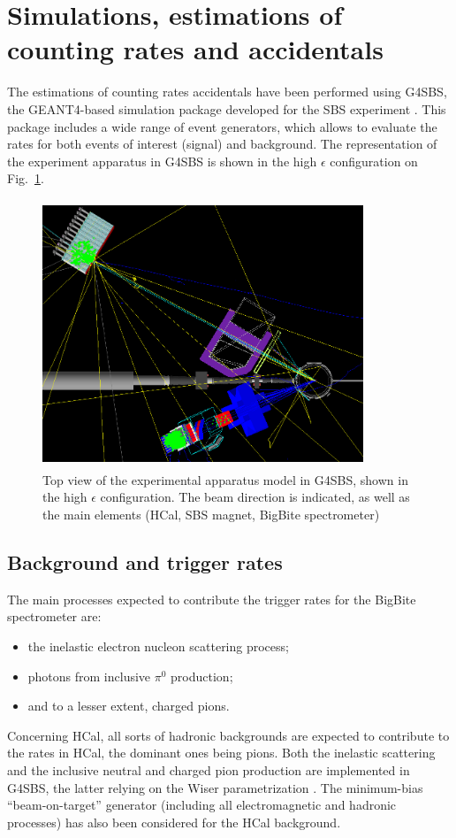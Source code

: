 
\section{Simulations, estimations of counting rates and accidentals}\label{sec:simu}

The estimations of counting rates accidentals have been performed using G4SBS, the GEANT4-based simulation package developed for the SBS experiment \cite{g4sbs}.
This package includes a wide range of event generators, which allows to evaluate the rates for both events of interest (signal) and background.
The representation of the experiment apparatus in G4SBS is shown in the high $\epsilon$ configuration on Fig.~\ref{fig:g4sbssetup}. 

\begin{figure}[!h]
  \centering
    \includegraphics[width=9.6cm,height=8cm]{Plots/SetupHiEPoint.png}
    \caption{Top view of the experimental apparatus model in G4SBS, shown in the high $\epsilon$ configuration. The beam direction is indicated, as well as the main elements (HCal, SBS magnet, BigBite spectrometer)}
    \label{fig:g4sbssetup}
\end{figure}

\subsection{Background and trigger rates}
The main processes expected to contribute the trigger rates for the BigBite spectrometer are:
%
\begin{itemize}
\item{the inelastic electron nucleon scattering process;}
\item{photons from inclusive $\pi^0$ production;}
\item{and to a lesser extent, charged pions.}
\end{itemize}
%
Concerning HCal, all sorts of hadronic backgrounds are expected to contribute to the rates in HCal, the dominant ones being pions.
Both the inelastic scattering and the inclusive neutral and charged pion production are implemented in G4SBS, the latter relying on the Wiser parametrization \cite{wiser}.
The minimum-bias ``beam-on-target'' generator (including all electromagnetic and hadronic processes) has also been considered for the HCal background.


